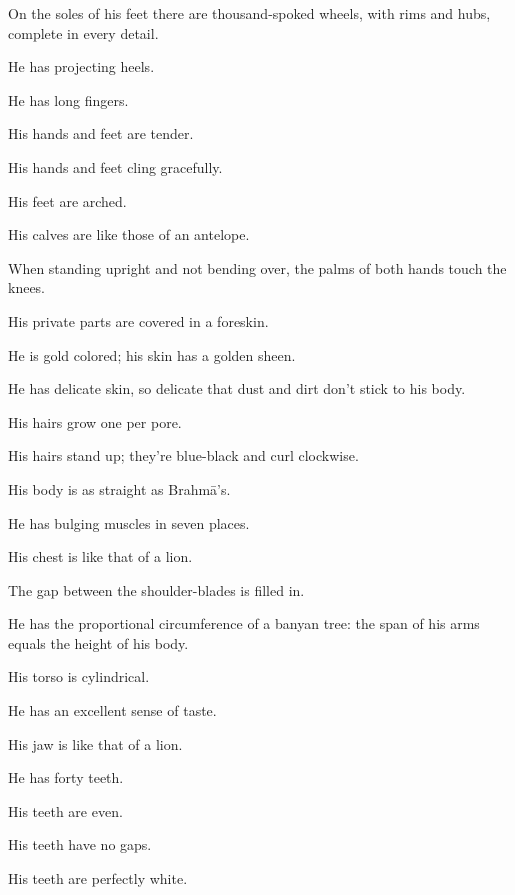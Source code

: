 \documentclass[12pt,openany]{book}%
\begin{document}
On the soles of his feet there are thousand-spoked wheels, with rims and hubs, complete in every detail. 

He has projecting heels. 

He has long fingers. 

His hands and feet are tender. 

His hands and feet cling gracefully. 

His feet are arched. 

His calves are like those of an antelope. 

When standing upright and not bending over, the palms of both hands touch the knees. 

His private parts are covered in a foreskin. 

He is gold colored; his skin has a golden sheen. 

He has delicate skin, so delicate that dust and dirt don’t stick to his body. 

His hairs grow one per pore. 

His hairs stand up; they’re blue-black and curl clockwise. 

His body is as straight as \textsanskrit{Brahmā}’s. 

He has bulging muscles in seven places. 

His chest is like that of a lion. 

The gap between the shoulder-blades is filled in. 

He has the proportional circumference of a banyan tree: the span of his arms equals the height of his body. 

His torso is cylindrical. 

He has an excellent sense of taste. 

His jaw is like that of a lion. 

He has forty teeth. 

His teeth are even. 

His teeth have no gaps. 

His teeth are perfectly white. 
\end{document}
